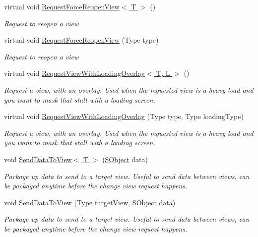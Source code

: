 \begin{DoxyCompactItemize}
virtual void \hyperlink{class_scaffolding_1_1_view_request_a5c031132968ce946ce612ca3a79b1075}{Request\+Force\+Reopen\+View$<$ T $>$} ()
\begin{DoxyCompactList}\small\item\em Request to reopen a view \end{DoxyCompactList}\item 
virtual void \hyperlink{class_scaffolding_1_1_view_request_af867121a024ce722629fe9ad23a8207f}{Request\+Force\+Reopen\+View} (Type type)
\begin{DoxyCompactList}\small\item\em Request to reopen a view \end{DoxyCompactList}\item 
virtual void \hyperlink{class_scaffolding_1_1_view_request_ae9834b37d6a291e9666f1d47a0614e74}{Request\+View\+With\+Loading\+Overlay$<$ T, L $>$} ()
\begin{DoxyCompactList}\small\item\em Request a view, with an overlay. Used when the requested view is a heavy load and you want to mask that stall with a loading screen. \end{DoxyCompactList}\item 
virtual void \hyperlink{class_scaffolding_1_1_view_request_a46ea4104f8158757661c1626b074b665}{Request\+View\+With\+Loading\+Overlay} (Type type, Type loading\+Type)
\begin{DoxyCompactList}\small\item\em Request a view, with an overlay. Used when the requested view is a heavy load and you want to mask that stall with a loading screen. \end{DoxyCompactList}\item 
void \hyperlink{class_scaffolding_1_1_view_request_af8aa731570962d7a79a83575726e033e}{Send\+Data\+To\+View$<$ T $>$} (\hyperlink{class_scaffolding_1_1_s_object}{S\+Object} data)
\begin{DoxyCompactList}\small\item\em Package up data to send to a target view. Useful to send data between views, can be packaged anytime before the change view request happens. \end{DoxyCompactList}\item 
void \hyperlink{class_scaffolding_1_1_view_request_a9ed5d8133e13eeb40abf1c897e89401d}{Send\+Data\+To\+View} (Type target\+View, \hyperlink{class_scaffolding_1_1_s_object}{S\+Object} data)
\begin{DoxyCompactList}\small\item\em Package up data to send to a target view. Useful to send data between views, can be packaged anytime before the change view request happens. \end{DoxyCompactList}\item 

\end{DoxyCompactItemize}
